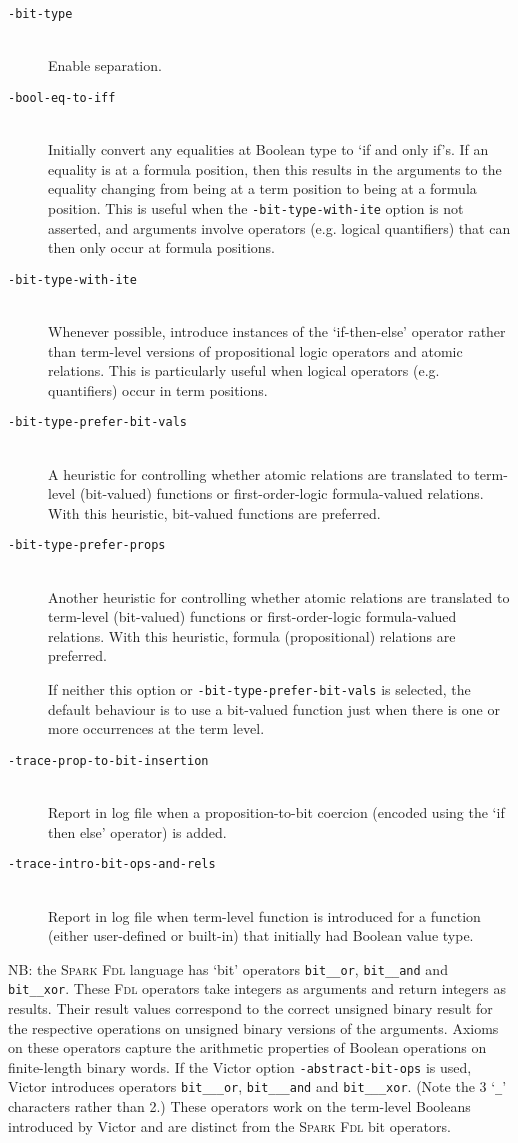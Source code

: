 \documentclass[12pt,fleqn]{article}
\newcommand{\spark}{\textsc{Spark}}
\newcommand{\fdl}{\textsc{Fdl}}
\newcommand{\optionb}[1]{\item[\texttt{-{#1}}]\ \\}
\begin{document}
\begin{description}
\optionb{bit-type} Enable separation.  
\optionb{bool-eq-to-iff}
  Initially convert any equalities at Boolean type to `if and only if's.
  If an equality is at a formula position, then this results in the
  arguments to the equality changing from being at a term position to
  being at a formula position.  This is useful when the
  \texttt{-bit-type-with-ite} option is not asserted, and arguments
  involve operators (e.g. logical quantifiers) that can then only occur
  at formula positions.

\optionb{bit-type-with-ite} Whenever possible, introduce instances
  of the `if-then-else' operator rather than term-level versions of
  propositional logic operators and atomic relations.  This is
  particularly useful when logical operators (e.g. quantifiers) occur
  in term positions.
  
\optionb{bit-type-prefer-bit-vals}
  A heuristic for controlling whether atomic relations are translated
  to term-level (bit-valued) functions or first-order-logic formula-valued
  relations.
  With this heuristic, bit-valued functions are preferred.

\optionb{bit-type-prefer-props}
  Another heuristic for controlling whether atomic relations are translated
  to term-level (bit-valued) functions or first-order-logic formula-valued
  relations.
  With this heuristic, formula (propositional) relations are preferred.

  If neither this option or \texttt{-bit-type-prefer-bit-vals} is selected,
  the default behaviour is to use a bit-valued function just when 
  there is one or more occurrences at the term level.

\optionb{trace-prop-to-bit-insertion}
  Report in log file when a proposition-to-bit coercion (encoded using the
  `if then else' operator) is added.
 
\optionb{trace-intro-bit-ops-and-rels}
  Report in log file when term-level function is introduced for a function
  (either user-defined or built-in) that initially had Boolean value type.

\end{description}

NB: the \spark{} \fdl{} language has `bit' operators 
\texttt{bit\_\_or},
\texttt{bit\_\_and} and 
\texttt{bit\_\_xor}.
%
These \fdl{} operators take integers as arguments and return integers
as results.  Their result values correspond to the correct unsigned
binary result for the respective operations on unsigned binary
versions of the arguments.  Axioms on these operators capture the
arithmetic properties of Boolean operations on finite-length binary
words.
%
If the Victor option \texttt{-abstract-bit-ops} is used, Victor introduces 
operators
\texttt{bit\_\_\_or},
\texttt{bit\_\_\_and} and 
\texttt{bit\_\_\_xor}. (Note the 3 `\texttt{\_}' characters rather than 2.)
%
These operators work on the term-level Booleans introduced by Victor and
are distinct from the \spark{} \fdl{} bit operators.
\end{document}
